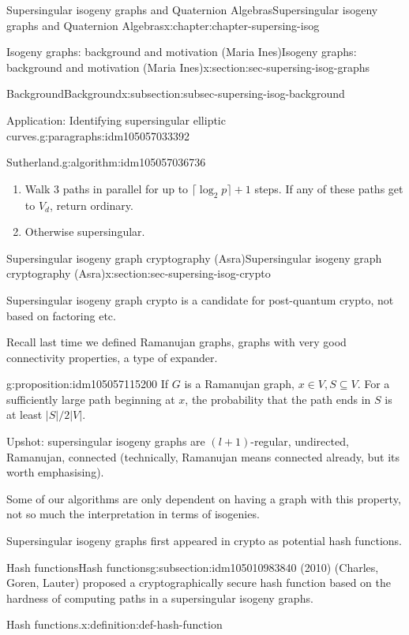 \documentclass[oneside,10pt,]{book}
\numberwithin{equation}{section}
\begin{document}
\begin{chapterptx}{Supersingular isogeny graphs and Quaternion Algebras}{}{Supersingular isogeny graphs and Quaternion Algebras}{}{}{x:chapter:chapter-supersing-isog}
\begin{sectionptx}{Isogeny graphs: background and motivation (Maria Ines)}{}{Isogeny graphs: background and motivation (Maria Ines)}{}{}{x:section:sec-supersing-isog-graphs}
\begin{subsectionptx}{Background}{}{Background}{}{}{x:subsection:subsec-supersing-isog-background}
\begin{paragraphs}{Application: Identifying supersingular elliptic curves.}{g:paragraphs:idm105057033392}
\begin{algorithm}{Sutherland.}{}{g:algorithm:idm105057036736}
\begin{enumerate}
\item{}Walk 3 paths in parallel for up to \(\lceil \log_2 p \rceil + 1 \) steps. If any of these paths get to \(V_d\), return ordinary.%
\item{}Otherwise supersingular.%
\end{enumerate}
%
\end{algorithm}
\end{paragraphs}%
\end{subsectionptx}
\end{sectionptx}
%
%
\typeout{************************************************}
\typeout{************************************************}
%
\begin{sectionptx}{Supersingular isogeny graph cryptography (Asra)}{}{Supersingular isogeny graph cryptography (Asra)}{}{}{x:section:sec-supersing-isog-crypto}
\begin{introduction}{}%
Supersingular isogeny graph crypto is a candidate for post-quantum crypto, not based on factoring etc.%
\par
Recall last time we defined Ramanujan graphs, graphs with very good connectivity properties, a type of expander.%
\begin{proposition}{}{}{g:proposition:idm105057115200}%
If \(G\) is a Ramanujan graph, \(x\in V, S\subseteq V\). For a sufficiently large path beginning at \(x\), the probability that the path ends in \(S\) is at least \(|S|/2|V|\).%
\end{proposition}
Upshot: supersingular isogeny graphs are \((l +1)\)-regular, undirected, Ramanujan, connected (technically, Ramanujan means connected already, but its worth emphasising).%
\par
Some of our algorithms are only dependent on having a graph with this property, not so much the interpretation in terms of isogenies.%
\par
Supersingular isogeny graphs first appeared in crypto as potential hash functions.%
\end{introduction}%
%
%
\typeout{************************************************}
\typeout{************************************************}
%
\begin{subsectionptx}{Hash functions}{}{Hash functions}{}{}{g:subsection:idm105010983840}
(2010) (Charles, Goren, Lauter) proposed a cryptographically secure hash function based on the hardness of computing paths in a supersingular isogeny graphs.%
\begin{definition}{Hash functions.}{x:definition:def-hash-function}%

\end{definition}
\end{subsectionptx}
\end{sectionptx}
\end{chapterptx}
\end{document}
